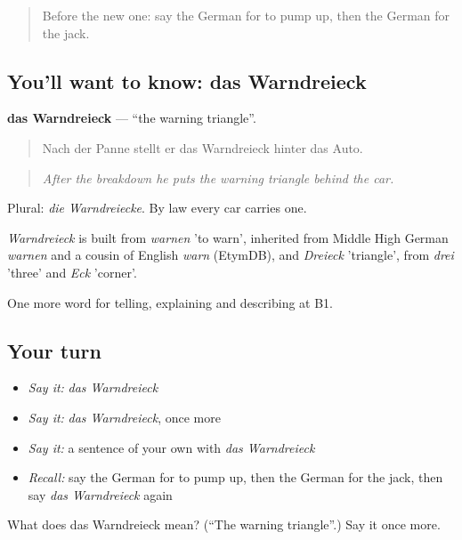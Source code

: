 \label{lesson:GE-C404-warndreieck}



\begin{quote}
Before the new one: say the German for to pump up, then the German for the jack.
\end{quote}

\subsection*{You'll want to know: das Warndreieck}
\textbf{das Warndreieck} — \textquotedblleft{}the warning triangle\textquotedblright{}.

\begin{quote}
Nach der Panne stellt er das Warndreieck hinter das Auto.
\end{quote}

\begin{quote}
\emph{After the breakdown he puts the warning triangle behind the car.}
\end{quote}

Plural: \emph{die Warndreiecke}. By law every car carries one.

\begin{cousinweb}
\emph{Warndreieck} is built from \emph{warnen} 'to warn', inherited from Middle High German \emph{warnen} and a cousin of English \emph{warn} (EtymDB), and \emph{Dreieck} 'triangle', from \emph{drei} 'three' and \emph{Eck} 'corner'.
\end{cousinweb}

\begin{grammarlens}[title={What you've built}]
One more word for telling, explaining and describing at B1.
\end{grammarlens}

\subsection*{Your turn}
\begin{itemize}
\raggedright
  \item \emph{Say it:} \emph{das Warndreieck}
  \item \emph{Say it:} \emph{das Warndreieck}, once more
  \item \emph{Say it:} a sentence of your own with \emph{das Warndreieck}
  \item \emph{Recall:} say the German for to pump up, then the German for the jack, then say \emph{das Warndreieck} again
\end{itemize}

\begin{tcolorbox}[breakable,colback=teal!4,colframe=teal!35!black,title={Before you move on}]
What does das Warndreieck mean? (\textquotedblleft{}The warning triangle\textquotedblright{}.) Say it once more.
\end{tcolorbox}
